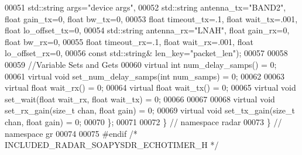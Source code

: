 \begin{DoxyCode}
00051         std::string args=\textcolor{stringliteral}{"device args"},
00052         std::string antenna\_tx=\textcolor{stringliteral}{"BAND2"}, \textcolor{keywordtype}{float} gain\_tx=0, \textcolor{keywordtype}{float} bw\_tx=0,
00053         \textcolor{keywordtype}{float} timeout\_tx=.1, \textcolor{keywordtype}{float} wait\_tx=.001, \textcolor{keywordtype}{float} lo\_offset\_tx=0,
00054         std::string antenna\_rx=\textcolor{stringliteral}{"LNAH"}, \textcolor{keywordtype}{float} gain\_rx=0, \textcolor{keywordtype}{float} bw\_rx=0,
00055         \textcolor{keywordtype}{float} timeout\_rx=.1, \textcolor{keywordtype}{float} wait\_rx=.001, \textcolor{keywordtype}{float} lo\_offset\_rx=0,
00056         \textcolor{keyword}{const} std::string& len\_key=\textcolor{stringliteral}{"packet\_len"});
00057 
00058 
00059       \textcolor{comment}{//Variable Sets and Gets}
00060       \textcolor{keyword}{virtual} \textcolor{keywordtype}{int} num\_delay\_samps()  = 0;
00061       \textcolor{keyword}{virtual} \textcolor{keywordtype}{void} set\_num\_delay\_samps(\textcolor{keywordtype}{int} num\_samps) = 0;
00062 
00063       \textcolor{keyword}{virtual} \textcolor{keywordtype}{float} wait\_rx()  = 0;
00064       \textcolor{keyword}{virtual} \textcolor{keywordtype}{float} wait\_tx()  = 0;
00065       \textcolor{keyword}{virtual} \textcolor{keywordtype}{void} set\_wait(\textcolor{keywordtype}{float} wait\_rx, \textcolor{keywordtype}{float} wait\_tx) = 0;
00066 
00067 
00068       \textcolor{keyword}{virtual} \textcolor{keywordtype}{void} set\_rx\_gain(\textcolor{keywordtype}{size\_t} chan, \textcolor{keywordtype}{float} gain) = 0;
00069       \textcolor{keyword}{virtual} \textcolor{keywordtype}{void} set\_tx\_gain(\textcolor{keywordtype}{size\_t} chan, \textcolor{keywordtype}{float} gain) = 0;
00070     \};
00071 
00072   \} \textcolor{comment}{// namespace radar}
00073 \} \textcolor{comment}{// namespace gr}
00074 
00075 \textcolor{preprocessor}{#endif }\textcolor{comment}{/* INCLUDED\_RADAR\_SOAPYSDR\_ECHOTIMER\_H */}\textcolor{preprocessor}{}
\end{DoxyCode}
